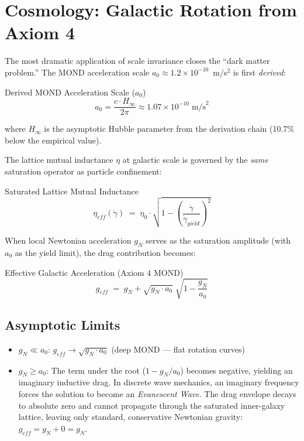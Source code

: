 
\chapter{Cosmology: Galactic Rotation from Axiom 4}
\label{ch:cosmology}

The most dramatic application of scale invariance closes the
``dark matter problem.''  The MOND acceleration scale
$a_0 \approx 1.2 \times 10^{-10}$~m/s$^2$ is first \textit{derived}:
\begin{resultbox}{Derived MOND Acceleration Scale ($a_0$)}
\begin{equation}
    a_0 = \frac{c \cdot H_\infty}{2\pi}
    \approx 1.07 \times 10^{-10}\;\text{m/s}^2
    \label{eq:a0_derived}
\end{equation}
\end{resultbox}
where $H_\infty$ is the asymptotic Hubble parameter from the derivation
chain (10.7\% below the empirical value).

The lattice mutual inductance $\eta$ at galactic scale is governed
by the \textit{same} saturation operator as particle confinement:
\begin{resultbox}{Saturated Lattice Mutual Inductance}
\begin{equation}
    \eta_{eff}(\dot\gamma) \;=\; \eta_0 \cdot
    \sqrt{1 - \left(\frac{\dot\gamma}{\dot\gamma_{yield}}\right)^{\!2}}
    \label{eq:galactic_inductance}
\end{equation}
\end{resultbox}
When local Newtonian acceleration $g_N$ serves as the saturation
amplitude (with $a_0$ as the yield limit), the drag contribution
becomes:
\begin{resultbox}{Effective Galactic Acceleration (Axiom 4 MOND)}
\begin{equation}
    g_{eff} \;=\; g_N + \sqrt{g_N \cdot a_0}\;
    \sqrt{1 - \frac{g_N}{a_0}}
    \label{eq:saturation_mond}
\end{equation}
\end{resultbox}

\section{Asymptotic Limits}

\begin{itemize}
    \item $g_N \ll a_0$: $g_{eff} \to \sqrt{g_N \cdot a_0}$
          \quad (deep MOND --- flat rotation curves)
    \item $g_N \ge a_0$: The term under the root ($1 - g_N/a_0$) becomes negative, yielding an imaginary inductive drag. In discrete wave mechanics, an imaginary frequency forces the solution to become an \textit{Evanescent Wave}. The drag envelope decays to absolute zero and cannot propagate through the saturated inner-galaxy lattice, leaving only standard, conservative Newtonian gravity:  $g_{eff} = g_N + 0 = g_N$.
\end{itemize}

